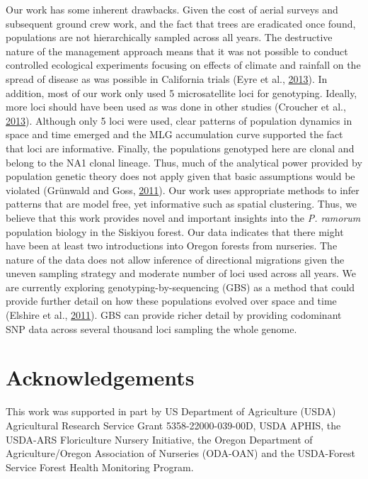 \documentclass[double,12pt]{beavtex}
\begin{document}
  Our work has some inherent drawbacks. Given the cost of aerial surveys
  and subsequent ground crew work, and the fact that trees are eradicated
  once found, populations are not hierarchically sampled across all years.
  The destructive nature of the management approach means that it was not
  possible to conduct controlled ecological experiments focusing on
  effects of climate and rainfall on the spread of disease as was possible
  in California trials (Eyre et al.,
  \protect\hyperlink{ref-eyre2013poulation}{2013}). In addition, most of
  our work only used 5 microsatellite loci for genotyping. Ideally, more
  loci should have been used as was done in other studies (Croucher et
  al., \protect\hyperlink{ref-croucher2013combining}{2013}). Although only
  5 loci were used, clear patterns of population dynamics in space and
  time emerged and the MLG accumulation curve supported the fact that loci
  are informative. Finally, the populations genotyped here are clonal and
  belong to the NA1 clonal lineage. Thus, much of the analytical power
  provided by population genetic theory does not apply given that basic
  assumptions would be violated (Grünwald and Goss,
  \protect\hyperlink{ref-grunwald2011evolution}{2011}). Our work uses
  appropriate methods to infer patterns that are model free, yet
  informative such as spatial clustering. Thus, we believe that this work
  provides novel and important insights into the \emph{P. ramorum}
  population biology in the Siskiyou forest. Our data indicates that there
  might have been at least two introductions into Oregon forests from
  nurseries. The nature of the data does not allow inference of
  directional migrations given the uneven sampling strategy and moderate
  number of loci used across all years. We are currently exploring
  genotyping-by-sequencing (GBS) as a method that could provide further
  detail on how these populations evolved over space and time (Elshire et
  al., \protect\hyperlink{ref-elshire2011robust}{2011}). GBS can provide
  richer detail by providing codominant SNP data across several thousand
  loci sampling the whole genome.
  
  \section{Acknowledgements}\label{acknowledgements-1}
  
  This work was supported in part by US Department of Agriculture (USDA)
  Agricultural Research Service Grant 5358-22000-039-00D, USDA APHIS, the
  USDA-ARS Floriculture Nursery Initiative, the Oregon Department of
  Agriculture/Oregon Association of Nurseries (ODA-OAN) and the
  USDA-Forest Service Forest Health Monitoring Program.
  
\end{document}
